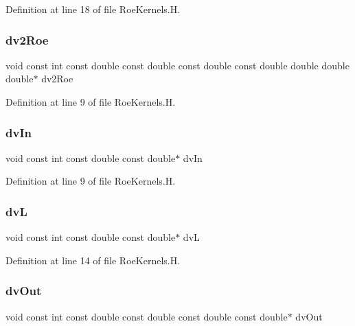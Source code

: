 Definition at line 18 of file Roe\+Kernels.\+H.

\hypertarget{RoeKernels_8H_a21369091011c3e247805004394055b28}{}\label{RoeKernels_8H_a21369091011c3e247805004394055b28} 
\subsubsection{\texorpdfstring{dv2\+Roe}{dv2Roe}}
{\footnotesize\ttfamily void const int const double const double const double const double double double double$\ast$ dv2\+Roe}



Definition at line 9 of file Roe\+Kernels.\+H.

\hypertarget{RoeKernels_8H_a24a50bb7f3155b1d6314eec79d33d669}{}\label{RoeKernels_8H_a24a50bb7f3155b1d6314eec79d33d669} 
\subsubsection{\texorpdfstring{dv\+In}{dvIn}}
{\footnotesize\ttfamily void const int const double const double$\ast$ dv\+In}



Definition at line 9 of file Roe\+Kernels.\+H.

\hypertarget{RoeKernels_8H_a6be6b080530ea7105efc943756d2d87e}{}\label{RoeKernels_8H_a6be6b080530ea7105efc943756d2d87e} 
\subsubsection{\texorpdfstring{dvL}{dvL}}
{\footnotesize\ttfamily void const int const double const double$\ast$ dvL}



Definition at line 14 of file Roe\+Kernels.\+H.

\hypertarget{RoeKernels_8H_ac5fd034bc232848163b16d30e790e8b1}{}\label{RoeKernels_8H_ac5fd034bc232848163b16d30e790e8b1} 
\subsubsection{\texorpdfstring{dv\+Out}{dvOut}}
{\footnotesize\ttfamily void const int const double const double const double const double$\ast$ dv\+Out}



